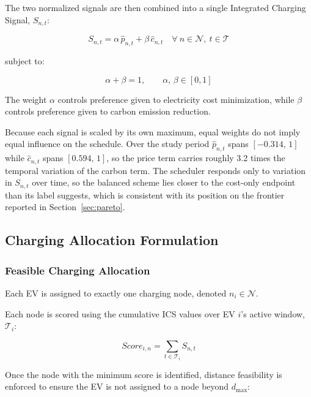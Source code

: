 \documentclass[sustainability,article,submit,moreauthors,pdftex]{Definitions/mdpi}
\begin{document}
The two normalized signals are then combined into a single Integrated Charging Signal, $S_{n,t}$:

\begin{equation}
    S_{n,t}
    =
    \alpha\,\hat{p}_{n,t}
    +
    \beta\,\hat{c}_{n,t}
    \quad \forall\ n \in \mathcal{N},\ t \in \mathcal{T}
    \label{eq:composite_signal}
\end{equation}

subject to:

\begin{equation}
    \alpha + \beta = 1,
    \qquad
    \alpha,\,\beta \in [0,1]
    \label{eq:weights}
\end{equation}

The weight $\alpha$ controls preference given to electricity cost minimization, while $\beta$ controls preference given to carbon emission reduction.

Because each signal is scaled by its own maximum, equal weights do not imply equal influence on the schedule. Over the study period $\hat{p}_{n,t}$ spans $[-0.314,\,1]$ while $\hat{c}_{n,t}$ spans $[0.594,\,1]$, so the price term carries roughly 3.2 times the temporal variation of the carbon term. The scheduler responds only to variation in $S_{n,t}$ over time, so the balanced scheme lies closer to the cost-only endpoint than its label suggests, which is consistent with its position on the frontier reported in Section~\ref{sec:pareto}.

\subsection{Charging Allocation Formulation}

\subsubsection{Feasible Charging Allocation}

Each EV is assigned to exactly one charging node, denoted $n_i \in \mathcal{N}$.

Each node is scored using the cumulative ICS values over EV $i$'s active window, $\mathcal{T}_i$:

\begin{equation}
Score_{i,n}
=
\sum_{t \in \mathcal{T}_i} S_{n,t}
\label{eq:assignment_score}
\end{equation}

Once the node with the minimum score is identified, distance feasibility is enforced to ensure the EV is not assigned to a node beyond $d_{\max}$:
\end{document}
